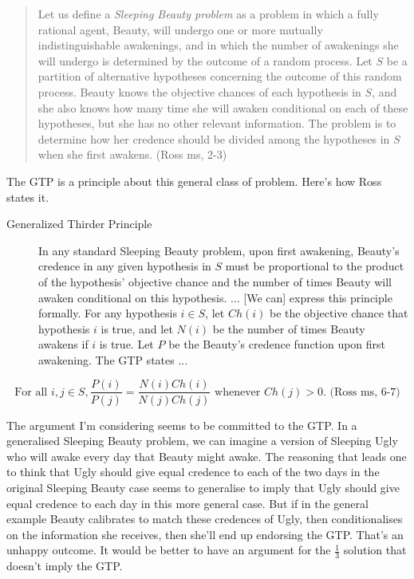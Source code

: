 \begin{quote}Let us define a \textit{Sleeping Beauty problem} as a problem in which a fully rational agent, Beauty, will undergo one or more mutually indistinguishable awakenings, and in which the number of awakenings she will undergo is determined by the outcome of a random process. Let \(S\) be a partition of alternative hypotheses concerning the outcome of this random process. Beauty knows the objective chances of each hypothesis in \(S\), and she also knows how many time she will awaken conditional on each of these hypotheses, but she has no other relevant information. The problem is to determine how her credence should be divided among the hypotheses in \(S\) when she first awakens. (Ross ms, 2-3)\end{quote}
\noindent The GTP is a principle about this general class of problem. Here's how Ross states it. 
\begin{sloppy}
\begin{description}
\item[Generalized Thirder Principle] In any standard Sleeping Beauty problem, upon first awakening, Beauty's credence in any given hypothesis in \(S\) must be proportional to the product of the hypothesis' objective chance and the number of times Beauty will awaken conditional on this hypothesis. ... [We can] express this principle formally. For any hypothesis \(i \in S\), let \(Ch(i)\) be the objective chance that hypothesis \(i\) is true, and let \(N(i)\) be the number of times Beauty awakens if \(i\) is true. Let \(P\) be the Beauty's credence function upon first awakening. The GTP states ...
\end{description}
\end{sloppy}
\begin{equation}
\text{For all }i, j \in S, \frac{P(i)}{P(j)} = \frac{N(i)Ch(i)}{N(j)Ch(j)} \text{ whenever }Ch(j) >  0. \text{ (Ross ms, 6-7)}
\end{equation}

\noindent The argument I'm considering seems to be committed to the GTP. In a generalised Sleeping Beauty problem, we can imagine a version of Sleeping Ugly who will awake every day that Beauty might awake. The reasoning that leads one to think that Ugly should give equal credence to each of the two days in the original Sleeping Beauty case seems to generalise to imply that Ugly should give equal credence to each day in this more general case. But if in the general example Beauty calibrates to match these credences of Ugly, then conditionalises on the information she receives, then she'll end up endorsing the GTP. That's an unhappy outcome. It would be better to have an argument for the \(\frac{1}{3}\) solution that doesn't imply the GTP.

